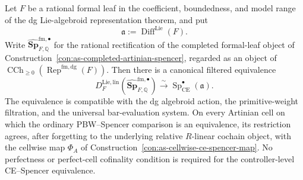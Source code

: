 \begin{theorem}
\label{thm:as-rational-ce-spencer}
Let $F$ be a rational formal leaf in the coefficient, boundedness, and model
range of the dg Lie-algebroid representation theorem, and put
\[
    \mathfrak a
    :=
    \operatorname{Diff}^{\mathrm{Lie}}(F).
\]
Write
$\widehat{\mathbf{Sp}}_{F,\mathbb Q}^{\mathrm{fm},\bullet}$ for the rational
rectification of the completed formal-leaf object of
Construction~\ref{con:as-completed-artinian-spencer}, regarded as an object of
$\operatorname{CCh}_{\geq0}(\operatorname{Rep}^{\mathrm{fm,dg}}(F))$.
Then there is a canonical filtered equivalence
\[
\boxed{
    D_F^{\mathrm{Lie,lin}}
    \left(
        \widehat{\mathbf{Sp}}_{F,\mathbb Q}^{\mathrm{fm},\bullet}
    \right)
    \xrightarrow{\sim}
    \operatorname{Sp}_{\mathrm{CE}}^{\bullet}
    \left(
        \mathfrak a
    \right).
}
\]
The equivalence is compatible with the dg algebroid action, the
primitive-weight filtration, and the universal bar-evaluation system.  On
every Artinian cell on which the ordinary PBW--Spencer comparison is an
equivalence, its restriction agrees, after forgetting to the underlying
relative $R$-linear cochain object, with the cellwise map $\Phi_A$ of
Construction~\ref{con:as-cellwise-ce-spencer-map}.  No perfectness or
perfect-cell cofinality condition is required for the controller-level
CE--Spencer equivalence.
\end{theorem}

